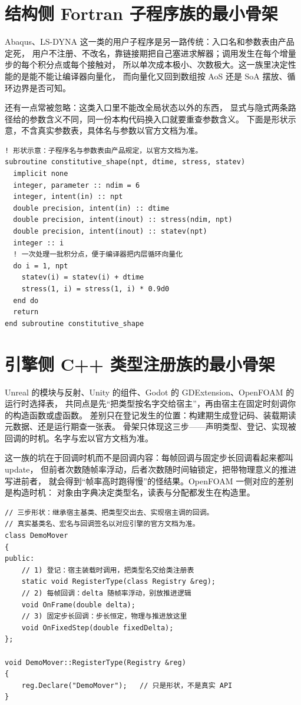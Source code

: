 \documentclass[12pt,a4paper,fontset=fandol]{ctexbook}
\newcommand{\Lang}[1]{\textsf{#1}}
\newcommand{\CPP}{\Lang{C++}}
\begin{document}
\section{结构侧 Fortran 子程序族的最小骨架}

Abaqus、LS-DYNA 这一类的用户子程序是另一路传统：入口名和参数表由产品定死，
用户不注册、不改名，靠链接期把自己塞进求解器；调用发生在每个增量步的每个积分点或每个接触对，
所以单次成本极小、次数极大。这一族里决定性能的是能不能让编译器向量化，
而向量化又回到数组按 AoS 还是 SoA 摆放、循环边界是否可知。

还有一点常被忽略：这类入口里不能改全局状态以外的东西，
显式与隐式两条路径给的参数含义不同，同一份本构代码换入口就要重查参数含义。
下面是形状示意，不含真实参数表，具体名与参数以官方文档为准。

\begin{lstlisting}[style=fortranstyle, caption={Fortran 用户子程序族的最小形状：固定名字、批量积分点、纯计算}, label={lst:apB-fortran-shape}]
! 形状示意：子程序名与参数表由产品规定，以官方文档为准。
subroutine constitutive_shape(npt, dtime, stress, statev)
  implicit none
  integer, parameter :: ndim = 6
  integer, intent(in) :: npt
  double precision, intent(in) :: dtime
  double precision, intent(inout) :: stress(ndim, npt)
  double precision, intent(inout) :: statev(npt)
  integer :: i
  ! 一次处理一批积分点，便于编译器把内层循环向量化
  do i = 1, npt
    statev(i) = statev(i) + dtime
    stress(1, i) = stress(1, i) * 0.9d0
  end do
  return
end subroutine constitutive_shape
\end{lstlisting}

\section{引擎侧 \CPP{} 类型注册族的最小骨架}

Unreal 的模块与反射、Unity 的组件、Godot 的 GDExtension、OpenFOAM 的运行时选择表，
共同点是先``把类型按名字交给宿主''，再由宿主在固定时刻调你的构造函数或虚函数。
差别只在登记发生的位置：构建期生成登记码、装载期读元数据、还是运行期查一张表。
骨架只体现这三步——声明类型、登记、实现被回调的时机。名字与宏以官方文档为准。

这一族的坑在于回调时机而不是回调内容：每帧回调与固定步长回调看起来都叫 update，
但前者次数随帧率浮动，后者次数随时间轴锁定，把带物理意义的推进写进前者，
就会得到``帧率高时跑得慢''的怪结果。OpenFOAM 一侧对应的差别是构造时机：
对象由字典决定类型名，读表与分配都发生在构造里。

\begin{lstlisting}[style=cppstyle, caption={引擎侧类型注册的三步形状：声明、登记、被回调}, label={lst:apB-engine-shape}]
// 三步形状：继承宿主基类、把类型交出去、实现宿主调的回调。
// 真实基类名、宏名与回调签名以对应引擎的官方文档为准。
class DemoMover
{
public:
    // 1) 登记：宿主装载时调用，把类型名交给类注册表
    static void RegisterType(class Registry &reg);
    // 2) 每帧回调：delta 随帧率浮动，别放推进逻辑
    void OnFrame(double delta);
    // 3) 固定步长回调：步长恒定，物理与推进放这里
    void OnFixedStep(double fixedDelta);
};

void DemoMover::RegisterType(Registry &reg)
{
    reg.Declare("DemoMover");   // 只是形状，不是真实 API
}
\end{lstlisting}
\end{document}
